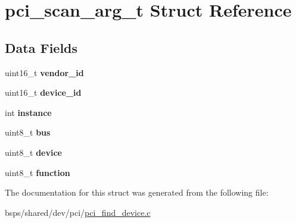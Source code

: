 \hypertarget{structpci__scan__arg__t}{}\section{pci\+\_\+scan\+\_\+arg\+\_\+t Struct Reference}
\label{structpci__scan__arg__t}
\subsection*{Data Fields}
\begin{DoxyCompactItemize}
\item 
\mbox{\label{structpci__scan__arg__t_a9826d8537543ff78c57baa47da7b5ff8}} 
uint16\+\_\+t {\bfseries vendor\+\_\+id}
\item 
\mbox{\label{structpci__scan__arg__t_afd74811b861e24a5bdb8fc9aea9652e4}} 
uint16\+\_\+t {\bfseries device\+\_\+id}
\item 
\mbox{\label{structpci__scan__arg__t_aa1f222d1ed93b22525b5e8cdfee68b3b}} 
int {\bfseries instance}
\item 
\mbox{\label{structpci__scan__arg__t_a8dc911a515c453544e804266d30a169d}} 
uint8\+\_\+t {\bfseries bus}
\item 
\mbox{\label{structpci__scan__arg__t_af2dddf71de01d6d981289d4dbcb15844}} 
uint8\+\_\+t {\bfseries device}
\item 
\mbox{\label{structpci__scan__arg__t_a7103f0fa2ea83de3816ad05f6446ffa8}} 
uint8\+\_\+t {\bfseries function}
\end{DoxyCompactItemize}


The documentation for this struct was generated from the following file\+:\begin{DoxyCompactItemize}
\item 
bsps/shared/dev/pci/\mbox{\hyperlink{pci__find__device_8c}{pci\+\_\+find\+\_\+device.\+c}}\end{DoxyCompactItemize}
